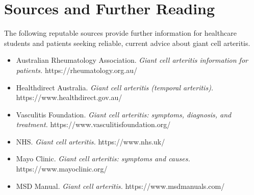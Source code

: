 \section*{Sources and Further Reading}
The following reputable sources provide further information for healthcare students and patients seeking reliable, current advice about giant cell arteritis.

\begin{itemize}
    \item Australian Rheumatology Association. \textit{Giant cell arteritis information for patients.} https://rheumatology.org.au/
    \item Healthdirect Australia. \textit{Giant cell arteritis (temporal arteritis).} https://www.healthdirect.gov.au/
    \item Vasculitis Foundation. \textit{Giant cell arteritis: symptoms, diagnosis, and treatment.} https://www.vasculitisfoundation.org/
    \item NHS. \textit{Giant cell arteritis.} https://www.nhs.uk/
    \item Mayo Clinic. \textit{Giant cell arteritis: symptoms and causes.} https://www.mayoclinic.org/
    \item MSD Manual. \textit{Giant cell arteritis.} https://www.msdmanuals.com/
\end{itemize}
